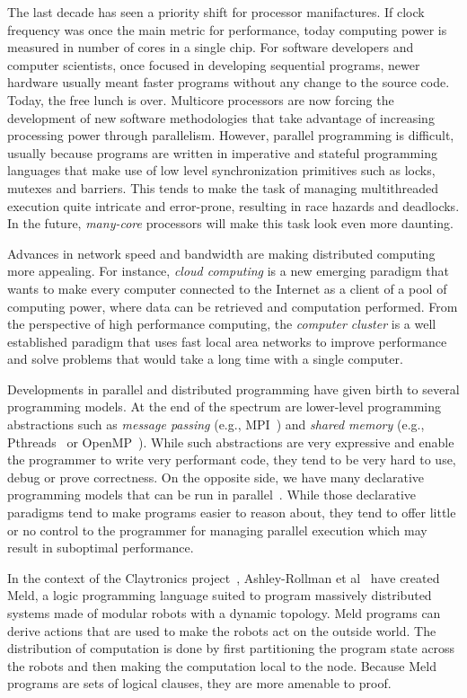 
The last decade has seen a priority shift for processor manifactures. If clock frequency
was once the main metric for performance, today computing power is measured in number of
cores in a single chip.
For software developers and computer scientists, once focused in developing sequential programs,
newer hardware usually meant faster programs without any change to the source code. Today,
the free lunch is over. Multicore processors are now forcing the development of
new software methodologies that take advantage of increasing processing power through parallelism.
However, parallel programming is difficult, usually because programs are written
in imperative and stateful programming languages that make use of low level synchronization
primitives such as locks, mutexes and barriers. This tends to make the task of managing multithreaded
execution quite intricate and error-prone, resulting in race hazards and deadlocks.
In the future, \emph{many-core} processors will make this task look even more daunting.

Advances in network speed and bandwidth are making distributed computing
more appealing. For instance, \emph{cloud computing} is a new emerging paradigm that wants
to make every computer connected to the Internet as a client of a pool of computing power,
where data can be retrieved and computation performed. From the perspective of high performance
computing, the \emph{computer cluster} is a well established paradigm that uses fast local area
networks to improve performance and solve problems that would take a long time with a single computer.

Developments in parallel and distributed programming have given birth to several programming models.
At the end of the spectrum are lower-level programming abstractions such as
\emph{message passing} (e.g., MPI~\cite{gabriel04-open-mpi}) and \emph{shared memory}
(e.g., Pthreads~\cite{Butenhof:1997:PPT:263953} or OpenMP~\cite{Chapman-2007-UOP-1370966}).
While such abstractions are very expressive and enable the programmer to write very performant code,
they tend to be very hard to use, debug or prove correctness.
On the opposite side, we have many declarative programming models
that can be run in parallel~\cite{Blelloch:1996:PPA:227234.227246}.
While those declarative paradigms tend to make programs easier to reason about, they tend to offer
little or no control to the programmer for managing parallel execution
which may result in suboptimal performance.

In the context of the Claytronics project~\cite{goldstein-computer05}, Ashley-Rollman et
al~\cite{ashley-rollman-iclp09, ashley-rollman-derosa-iros07wksp} have created Meld, a logic programming language suited to
program massively distributed systems made of modular robots with a dynamic topology. Meld programs can derive actions that are used
to make the robots act on the outside world. The distribution of computation is done
by first partitioning the program state across the robots and then making the computation local to the node. Because Meld programs
are sets of logical clauses, they are more amenable to proof.

